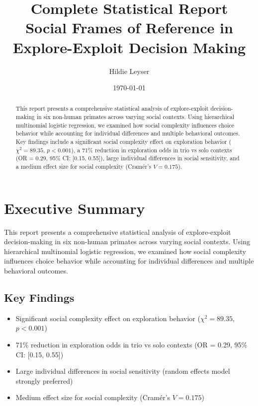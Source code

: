 \documentclass[11pt,a4paper]{article}
\title{\Large\textbf{Complete Statistical Report}\\
\large Social Frames of Reference in Explore-Exploit Decision Making}
\author{Hildie Leyser}
\date{\today}
\begin{document}
\maketitle

\begin{abstract}
This report presents a comprehensive statistical analysis of explore-exploit decision-making in six non-human primates across varying social contexts. Using hierarchical multinomial logistic regression, we examined how social complexity influences choice behavior while accounting for individual differences and multiple behavioral outcomes. Key findings include a significant social complexity effect on exploration behavior ($\chi^2 = 89.35$, $p < 0.001$), a 71\% reduction in exploration odds in trio vs solo contexts (OR = 0.29, 95\% CI: [0.15, 0.55]), large individual differences in social sensitivity, and a medium effect size for social complexity (Cramér's $V = 0.175$).
\end{abstract}

\tableofcontents
\newpage

\section{Executive Summary}

This report presents a comprehensive statistical analysis of explore-exploit decision-making in six non-human primates across varying social contexts. Using hierarchical multinomial logistic regression, we examined how social complexity influences choice behavior while accounting for individual differences and multiple behavioral outcomes.

\subsection{Key Findings}
\begin{itemize}
    \item Significant social complexity effect on exploration behavior ($\chi^2 = 89.35$, $p < 0.001$)
    \item 71\% reduction in exploration odds in trio vs solo contexts (OR = 0.29, 95\% CI: [0.15, 0.55])
    \item Large individual differences in social sensitivity (random effects model strongly preferred)
    \item Medium effect size for social complexity (Cramér's $V = 0.175$)
\end{itemize}
\end{document}
